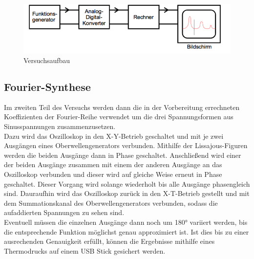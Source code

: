 \begin{figure}[H]
  \centering
  \includegraphics[width=15cm]{Aufbau.png}
  \caption{Versuchsaufbau \cite{skript}}
  \label{fig:Aufbau}
\end{figure}

\subsection{Fourier-Synthese}
Im zweiten Teil des Versuchs werden dann die in der Vorbereitung errechneten
Koeffizienten der Fourier-Reihe verwendet um die drei Spannungsformen aus
Sinusspannungen zusammenzusetzen. \\
Dazu wird das Oszilloskop in den X-Y-Betrieb geschaltet und mit je zwei
Ausgängen eines Oberwellengenerators verbunden. Mithilfe der Lissajous-Figuren
werden die beiden Ausgänge dann in Phase geschaltet. Anschließend wird einer der
beiden Ausgänge zusammen mit einem der anderen Ausgänge an das Oszilloskop
verbunden und dieser wird auf gleiche Weise erneut in Phase
geschaltet. Dieser Vorgang wird solange wiederholt bis alle Ausgänge phasengleich
sind. Dauraufhin wird das Oszilloskop zurück in den X-T-Betrieb gestellt und mit
dem Summationskanal des Oberwellengenerators verbunden, sodass die aufaddierten
Spannungen zu sehen sind. \\
Eventuell müssen die einzelnen Ausgänge dann noch um 180° variiert werden, bis
die entsprechende Funktion möglichst genau approximiert ist. Ist dies bis zu
einer ausrechenden Genauigkeit erfüllt, können die Ergebnisse mithilfe eines
Thermodrucks auf einem USB Stick gesichert werden.
